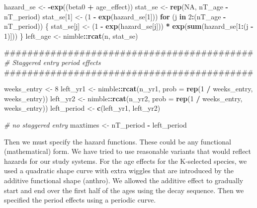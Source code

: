 \documentclass[11pt,]{article}
\newenvironment{Shaded}{\begin{snugshade}}{\end{snugshade}}
\newcommand{\KeywordTok}[1]{\textcolor[rgb]{0.13,0.29,0.53}{\textbf{#1}}}
\newcommand{\DataTypeTok}[1]{\textcolor[rgb]{0.13,0.29,0.53}{#1}}
\newcommand{\DecValTok}[1]{\textcolor[rgb]{0.00,0.00,0.81}{#1}}
\newcommand{\StringTok}[1]{\textcolor[rgb]{0.31,0.60,0.02}{#1}}
\newcommand{\CommentTok}[1]{\textcolor[rgb]{0.56,0.35,0.01}{\textit{#1}}}
\newcommand{\OtherTok}[1]{\textcolor[rgb]{0.56,0.35,0.01}{#1}}
\newcommand{\ControlFlowTok}[1]{\textcolor[rgb]{0.13,0.29,0.53}{\textbf{#1}}}
\newcommand{\OperatorTok}[1]{\textcolor[rgb]{0.81,0.36,0.00}{\textbf{#1}}}
\newcommand{\NormalTok}[1]{#1}
\begin{document}
\begin{Shaded}
\begin{Highlighting}[]
\NormalTok{  hazard_se <-}\StringTok{ }\OperatorTok{-}\KeywordTok{exp}\NormalTok{((beta0 }\OperatorTok{+}\StringTok{ }\NormalTok{age_effect))}
\NormalTok{  stat_se <-}\StringTok{ }\KeywordTok{rep}\NormalTok{(}\OtherTok{NA}\NormalTok{, nT_age }\OperatorTok{-}\StringTok{ }\NormalTok{nT_period)}
\NormalTok{  stat_se[}\DecValTok{1}\NormalTok{] <-}\StringTok{ }\NormalTok{(}\DecValTok{1} \OperatorTok{-}\StringTok{ }\KeywordTok{exp}\NormalTok{(hazard_se[}\DecValTok{1}\NormalTok{]))}
  \ControlFlowTok{for}\NormalTok{ (j }\ControlFlowTok{in} \DecValTok{2}\OperatorTok{:}\NormalTok{(nT_age }\OperatorTok{-}\StringTok{ }\NormalTok{nT_period)) \{}
\NormalTok{    stat_se[j] <-}\StringTok{ }\NormalTok{(}\DecValTok{1} \OperatorTok{-}\StringTok{ }\KeywordTok{exp}\NormalTok{(hazard_se[j])) }\OperatorTok{*}\StringTok{ }\KeywordTok{exp}\NormalTok{(}\KeywordTok{sum}\NormalTok{(hazard_se[}\DecValTok{1}\OperatorTok{:}\NormalTok{(j }\OperatorTok{-}\StringTok{ }\DecValTok{1}\NormalTok{)]))}
\NormalTok{  \}}
\NormalTok{  left_age <-}\StringTok{ }\NormalTok{nimble}\OperatorTok{::}\KeywordTok{rcat}\NormalTok{(n, stat_se)}

\NormalTok{  ###########################################}
  \CommentTok{# Staggered entry period effects}
\NormalTok{  ###########################################}

\NormalTok{  weeks_entry <-}\StringTok{ }\DecValTok{8}
\NormalTok{  left_yr1 <-}\StringTok{ }\NormalTok{nimble}\OperatorTok{::}\KeywordTok{rcat}\NormalTok{(n_yr1, }\DataTypeTok{prob =} \KeywordTok{rep}\NormalTok{(}\DecValTok{1} \OperatorTok{/}\StringTok{ }\NormalTok{weeks_entry, weeks_entry))}
\NormalTok{  left_yr2 <-}\StringTok{ }\NormalTok{nimble}\OperatorTok{::}\KeywordTok{rcat}\NormalTok{(n_yr2, }\DataTypeTok{prob =} \KeywordTok{rep}\NormalTok{(}\DecValTok{1} \OperatorTok{/}\StringTok{ }\NormalTok{weeks_entry, weeks_entry))}
\NormalTok{  left_period <-}\StringTok{ }\KeywordTok{c}\NormalTok{(left_yr1, left_yr2)}

  \CommentTok{# no staggered entry}
\NormalTok{  maxtimes <-}\StringTok{ }\NormalTok{nT_period }\OperatorTok{-}\StringTok{ }\NormalTok{left_period}
\end{Highlighting}
\end{Shaded}

Then we must specify the hazard functions. These could be any functional
(mathematical) form. We have tried to use reasonable variants that would
reflect hazards for our study systems. For the age effects for the
K-selected species, we used a quadratic shape curve with extra wiggles
that are introduced by the additive functional shape (anthro). We
allowed the additive effect to gradually start and end over the first
half of the ages using the decay sequence. Then we specified the period
effects using a periodic curve.
\end{document}
